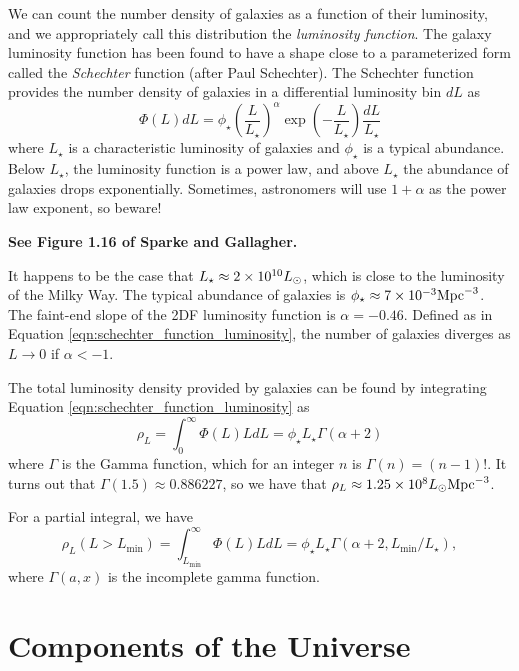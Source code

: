 \documentclass[]{article}
\begin{document}
We can count the number density of galaxies as a function of their luminosity,
and we appropriately call this distribution the {\it luminosity function}. The
galaxy luminosity function has been found to have a shape close to a parameterized
form called the {\it Schechter} function (after Paul Schechter).  The Schechter
function provides the number density of galaxies in a differential luminosity bin
$dL$ as
\begin{equation}
\label{eqn:schechter_function_luminosity}
\Phi(L)dL = \phi_{\star} \left(\frac{L}{L_{\star}}\right)^{\alpha}\exp\left(-\frac{L}{L_{\star}}\right)\frac{dL}{L_{\star}}
\end{equation}
\noindent
where $L_{\star}$ is a characteristic luminosity of galaxies and $\phi_{\star}$ is 
a typical abundance.  Below $L_\star$, the luminosity function is a power law, and
above $L_\star$ the abundance of galaxies drops exponentially. Sometimes, astronomers
will use $1+\alpha$ as the power law exponent, so beware!

{\bf See Figure 1.16 of Sparke and Gallagher.}

It happens to be the case that $L_{\star}\approx2\times10^{10}L_{\odot}$, which is close
to the luminosity of the Milky Way. The typical abundance of galaxies is $\phi_\star\approx7\times10^{-3}\mathrm{Mpc}^{-3}$. The faint-end slope of the 2DF luminosity function is $\alpha=-0.46$.
Defined as in Equation \ref{eqn:schechter_function_luminosity}, the number of galaxies
diverges as $L\to0$ if $\alpha<-1$.

The total luminosity density provided by galaxies can be found by integrating 
Equation \ref{eqn:schechter_function_luminosity} as
\begin{equation}
\rho_{L} = \int_{0}^{\infty} \Phi(L) L dL = \phi_\star L_{\star} \Gamma(\alpha + 2)
\end{equation}
\noindent
where $\Gamma$ is the Gamma function, which for an integer $n$ is $\Gamma(n) = (n-1)!$.
It turns out that $\Gamma(1.5)\approx0.886227$, so we have that 
$\rho_{L}\approx1.25\times10^{8}L_{\odot}\mathrm{Mpc}^{-3}$.

For a partial integral, we have
\begin{equation}
\rho_{L}(L>L_{\mathrm{min}}) = \int_{L_{\mathrm{min}}}^{\infty} \Phi(L) L dL = \phi_\star L_{\star} \Gamma(\alpha + 2, L_{\mathrm{min}}/L_{\star}),
\end{equation}
\noindent
where $\Gamma(a,x)$ is the incomplete gamma function.


\section{Components of the Universe}
\end{document}
